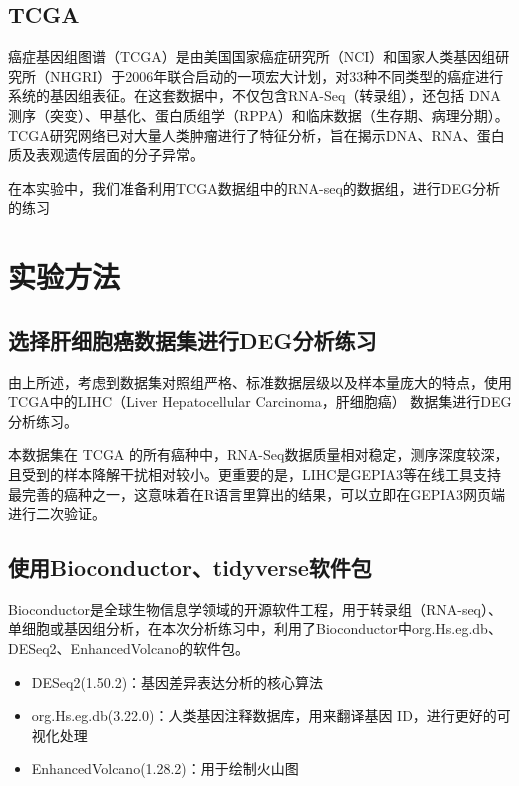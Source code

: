 \documentclass{article}
\begin{document}
\subsection{TCGA}

癌症基因组图谱（TCGA）是由美国国家癌症研究所（NCI）和国家人类基因组研究所（NHGRI）于2006年联合启动的一项宏大计划，对33种不同类型的癌症进行系统的基因组表征。在这套数据中，不仅包含RNA-Seq（转录组），还包括 DNA 测序（突变）、甲基化、蛋白质组学（RPPA）和临床数据（生存期、病理分期）。TCGA研究网络已对大量人类肿瘤进行了特征分析，旨在揭示DNA、RNA、蛋白质及表观遗传层面的分子异常。

在本实验中，我们准备利用TCGA数据组中的RNA-seq的数据组，进行DEG分析的练习

\section{实验方法}

\subsection{选择肝细胞癌数据集进行DEG分析练习}

由上所述，考虑到数据集对照组严格、标准数据层级以及样本量庞大的特点，使用TCGA中的LIHC（Liver Hepatocellular Carcinoma，肝细胞癌） 数据集进行DEG分析练习。

本数据集在 TCGA 的所有癌种中，RNA-Seq数据质量相对稳定，测序深度较深，且受到的样本降解干扰相对较小。更重要的是，LIHC是GEPIA3等在线工具支持最完善的癌种之一，这意味着在R语言里算出的结果，可以立即在GEPIA3网页端进行二次验证。

\subsection{使用Bioconductor、tidyverse软件包}

Bioconductor是全球生物信息学领域的开源软件工程，用于转录组（RNA-seq）、单细胞或基因组分析，在本次分析练习中，利用了Bioconductor中org.Hs.eg.db、DESeq2、EnhancedVolcano的软件包。

\begin{itemize}
    \item DESeq2(1.50.2)：基因差异表达分析的核心算法
    \item org.Hs.eg.db(3.22.0)：人类基因注释数据库，用来翻译基因 ID，进行更好的可视化处理
    \item EnhancedVolcano(1.28.2)：用于绘制火山图
\end{itemize}
\end{document}
